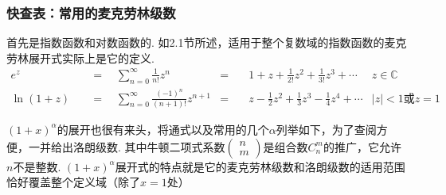 \documentclass[main.tex]{subfiles}
\begin{document}
\newpage
\subsubsection{快查表：常用的麦克劳林级数}

首先是指数函数和对数函数的. 如2.1节所述，适用于整个复数域的指数函数的麦克劳林展开式实际上是它的定义.
\begin{align*}
    e^z \quad&=\quad \sum_{n=0}^{\infty} \frac{1}{n!}z^n &=&\quad 1+z+\frac{1}{2!}z^2+\frac{1}{3!}z^3 +\cdots &z\in \mathbb{C} \\
    \ln(1+z) \quad&=\quad \sum_{n=0}^{\infty}\frac{(-1)^n}{(n+1)!}z^{n+1} &=&\quad z-\frac{1}{2}z^2+\frac{1}{3}z^3-\frac{1}{4}z^4+\cdots & |z|<1\mbox{或}z=1
\end{align*}

\((1+x)^{\alpha}\)的展开也很有来头，将通式以及常用的几个\(\alpha\)列举如下，为了查阅方便，一并给出洛朗级数. 其中牛顿二项式系数\(\begin{pmatrix}n\\m\end{pmatrix}\)是组合数\(C_n^m\)的推广，它允许\(n\)不是整数. \((1+x)^{\alpha}\)展开式的特点就是它的麦克劳林级数和洛朗级数的适用范围恰好覆盖整个定义域（除了\(x=1\)处）
\end{document}
